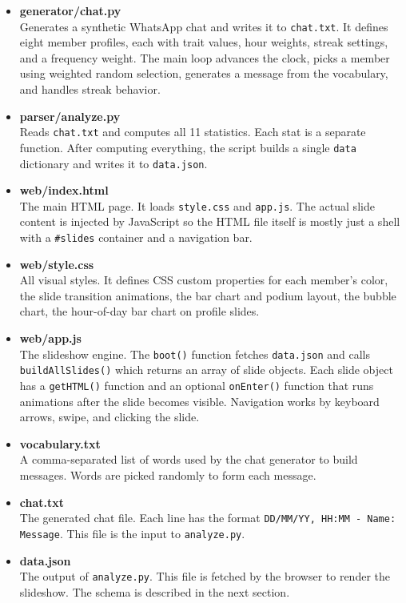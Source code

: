 \documentclass{article}
\begin{document}
\begin{itemize}

\item \textbf{generator/chat.py} \\
Generates a synthetic WhatsApp chat and writes it to \texttt{chat.txt}. It defines eight member profiles, each with trait values, hour weights, streak settings, and a frequency weight. The main loop advances the clock, picks a member using weighted random selection, generates a message from the vocabulary, and handles streak behavior.

\item \textbf{parser/analyze.py} \\
Reads \texttt{chat.txt} and computes all 11 statistics. Each stat is a separate function. After computing everything, the script builds a single \texttt{data} dictionary and writes it to \texttt{data.json}.
\item \textbf{web/index.html} \\
The main HTML page. It loads \texttt{style.css} and \texttt{app.js}. The actual slide content is injected by JavaScript so the HTML file itself is mostly just a shell with a \texttt{\#slides} container and a navigation bar.

\item \textbf{web/style.css} \\
All visual styles. It defines CSS custom properties for each member's color, the slide transition animations, the bar chart and podium layout, the bubble chart, the hour-of-day bar chart on profile slides.

\item \textbf{web/app.js} \\
The slideshow engine. The \texttt{boot()} function fetches \texttt{data.json} and calls \texttt{buildAllSlides()} which returns an array of slide objects. Each slide object has a \texttt{getHTML()} function and an optional \texttt{onEnter()} function that runs animations after the slide becomes visible. Navigation works by keyboard arrows, swipe, and clicking the slide.

\item \textbf{vocabulary.txt} \\
A comma-separated list of words used by the chat generator to build messages. Words are picked randomly to form each message.

\item \textbf{chat.txt} \\
The generated chat file. Each line has the format \texttt{DD/MM/YY, HH:MM - Name: Message}. This file is the input to \texttt{analyze.py}.

\item \textbf{data.json} \\
The output of \texttt{analyze.py}. This file is fetched by the browser to render the slideshow. The schema is described in the next section.

\end{itemize}
\end{document}
